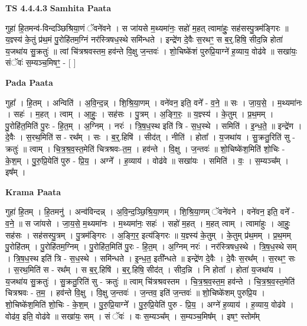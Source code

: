 \documentclass[17pt]{extarticle}
\begin{document}
\textbf{TS 4.4.4.3 } \newline
\textbf{Samhita Paata} \newline

गुहा॑ हि॒तमन्व॑-विन्दञ्छिश्रिया॒णं ॅवने॑वने । स जा॑यसे म॒थ्यमा॑नः॒ सहो॑ म॒हत् त्वामा॑हुः॒ सह॑सस्पु॒त्रम॑ङ्गिरः ॥ य॒ज्ञ्स्य॑ के॒तुं प्र॑थ॒मं पु॒रोहि॑तम॒ग्निं नर॑स्त्रिषध॒स्थे समि॑न्धते । इन्द्रे॑ण दे॒वैः स॒रथꣳ॒॒ स ब॒र्॒.हिषि॒ सीद॒न्नि होता॑ य॒जथा॑य सु॒क्रतुः॑ ॥ त्वां चि॑त्रश्रवस्तम॒ हव॑न्ते वि॒क्षु ज॒न्तवः॑ । शो॒चिष्के॑शं पुरुप्रि॒याग्ने॑ ह॒व्याय॒ वोढ॑वे ॥ सखा॑यः॒ संॅवः॑ स॒म्यञ्च॒मिषꣳ॒॒ - [  ] \newline

\textbf{Pada Paata} \newline

गुहा᳚ । हि॒तम् । अन्विति॑ । अ॒वि॒न्द॒न्न् । शि॒श्रि॒या॒णम् । वने॑वन॒ इति॒ वने᳚ - व॒ने॒ ॥ सः । जा॒य॒से॒ । म॒थ्यमा॑नः । सहः॑ । म॒हत् । त्वाम् । आ॒हुः॒ । सह॑सः । पु॒त्रम् । अ॒ङ्गि॒रः॒ ॥ य॒ज्ञ्स्य॑ । के॒तुम् । प्र॒थ॒मम् । पु॒रोहि॑त॒मिति॑ पु॒रः - हि॒त॒म् । अ॒ग्निम् । नरः॑ । त्रि॒ष॒ध॒स्थ इति॑ त्रि - स॒ध॒स्थे । समिति॑ । इ॒न्ध॒ते॒ ॥ इन्द्रे॑ण । दे॒वैः । स॒रथ॒मिति॑ स - रथ᳚म् । सः । ब॒र्॒.हिषि॑ । सीद॑त् । नीति॑ । होता᳚ । य॒जथा॑य । सु॒क्रतु॒रिति॑ सु - क्रतुः॑ ॥ त्वाम् । चि॒त्र॒श्र॒व॒स्त॒मेति॑ चित्रश्रवः-त॒म॒ । हव॑न्ते । वि॒क्षु । ज॒न्तवः॑ ॥ शो॒चिष्के॑श॒मिति॑ शो॒चिः - के॒श॒म् । पु॒रु॒प्रि॒येति॑ पुरु - प्रि॒य॒ । अग्ने᳚ । ह॒व्याय॑ । वोढ॑वे ॥ सखा॑यः । समिति॑ । वः॒ । स॒म्यञ्च᳚म् । इष᳚म् ।  \newline


\textbf{Krama Paata} \newline

गुहा॑ हि॒तम् । हि॒तमनु॑ । अन्व॑विन्दन्न् । अ॒वि॒न्द॒ञ्छि॒श्रि॒या॒णम् । शि॒श्रि॒या॒णम् ॅवने॑वने । वने॑वन॒ इति॒ वने᳚ - व॒ने॒ ॥ स जा॑यसे । जा॒य॒से॒ म॒थ्यमा॑नः । म॒थ्यमा॑नः॒ सहः॑ । सहो॑ म॒हत् । म॒हत् त्वाम् । त्वामा॑हुः । आ॒हुः॒ सह॑सः । सह॑सस्पु॒त्रम् । पु॒त्रम॑ङ्गिरः । अ॒ङ्गि॒र॒ इत्य॑ङ्गिरः ॥ य॒ज्ञ्स्य॑ के॒तुम् । के॒तुम् प्र॑थ॒मम् । प्र॒थ॒मम् पु॒रोहि॑तम् । पु॒रोहि॑तम॒ग्निम् । पु॒रोहि॑त॒मिति॑ पु॒रः - हि॒त॒म् । अ॒ग्निम् नरः॑ । नर॑स्त्रिषध॒स्थे । त्रि॒ष॒ध॒स्थे सम् । त्रि॒ष॒ध॒स्थ इति॑ त्रि - स॒ध॒स्थे । समि॑न्धते । इ॒न्ध॒त॒ इती᳚न्धते ॥ इन्द्रे॑ण दे॒वैः । दे॒वैः स॒रथ᳚म् । स॒रथꣳ॒॒ सः । स॒रथ॒मिति॑ स - रथ᳚म् । स ब॒र्॒.हिषि॑ । ब॒र्॒.हिषि॒ सीद॑त् । सीद॒न्नि । नि होता᳚ । होता॑ य॒जथा॑य । य॒जथा॑य सु॒क्रतुः॑ । सु॒क्रतु॒रिति॑ सु - क्रतुः॑ ॥ त्वाम् चि॑त्रश्रवस्तम । चि॒त्र॒श्र॒व॒स्त॒म॒ हव॑न्ते । चि॒त्र॒श्र॒व॒स्त॒मेति॑ चित्रश्रवः - त॒म॒ । हव॑न्ते वि॒क्षु । वि॒क्षु ज॒न्तवः॑ । ज॒न्तव॒ इति॑ ज॒न्तवः॑ ॥ शो॒चिष्के॑शम् पुरुप्रि॒य । शो॒चिष्के॑श॒मिति॑ शो॒चिः - के॒श॒म् । पु॒रु॒प्रि॒याग्ने᳚ । पु॒रु॒प्रि॒येति॑ पुरु - प्रि॒य॒ । अग्ने॑ ह॒व्याय॑ । ह॒व्याय॒ वोढ॑वे । वोढ॑व॒ इति॒ वोढ॑वे ॥ सखा॑यः॒ सम् । सं ॅवः॑ । वः स॒म्यञ्च᳚म् । स॒म्यञ्च॒मिष᳚म् । इषꣳ॒॒ स्तोम᳚म् \newline
\end{document}
